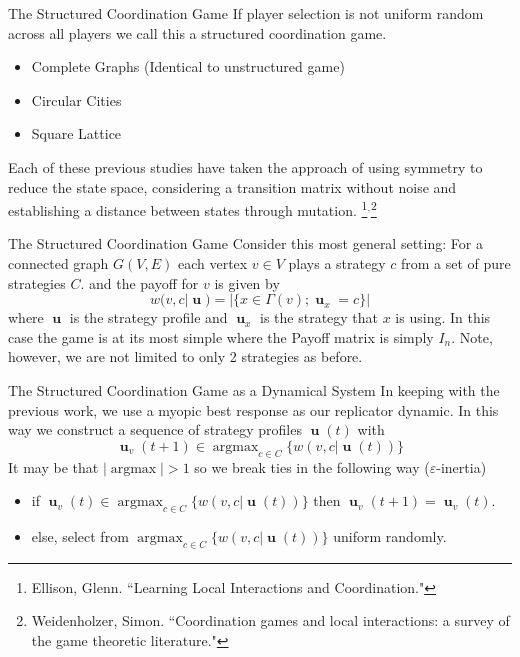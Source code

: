 \documentclass{beamer}
\DeclareMathOperator*{\argmax}{\text{argmax}}
\DeclareMathOperator{\uu}{\mathbf{u}}
\begin{document}
\begin{frame}{The Structured Coordination Game}
	If player selection is not uniform random across all players we call this a structured coordination game. 
	\begin{itemize}
		\item Complete Graphs (Identical to unstructured game)
		\item Circular Cities
		\item Square Lattice 
	\end{itemize}
	Each of these previous studies have taken the approach of using symmetry to reduce the state space, considering a transition matrix without noise and establishing a distance between states through mutation. \footnote{Ellison, Glenn. ``Learning Local Interactions and Coordination."}$^,$\footnote{Weidenholzer, Simon. ``Coordination games and local interactions: a survey of the game theoretic literature."}
\end{frame}

\begin{frame}{The Structured Coordination Game}
	Consider this most general setting: For a connected graph $G(V,E)$ each vertex $v\in V$ plays a strategy $c$ from a set of pure strategies $C$. and the payoff for $v$ is given by \begin{equation}
		w(v,c|\uu)=|\{x\in \Gamma (v);\uu_x=c\}|
	\end{equation}
	where $\uu$ is the strategy profile and $\uu_x$ is the strategy that $x$ is using. 
	In this case the game is at its most simple where the Payoff matrix is simply $I_n$. Note, however, we are not limited to only 2 strategies as before. 
\end{frame}

\begin{frame}{The Structured Coordination Game as a Dynamical System}
	In keeping with the previous work, we use a myopic best response as our replicator dynamic. In this way we construct a sequence of strategy profiles $\uu(t)$ with 
	\begin{equation}
		\uu_v(t+1)\in \argmax_{c\in C}\{w(v,c|\uu(t))\}
	\end{equation}
It may be that $|\argmax|>1$ so we break ties in the following way ($\varepsilon$-inertia) 
\begin{itemize}
	\item if $\uu_v(t)\in \argmax_{c\in C}\{w(v,c|\uu(t))\}$ then $ \uu_v(t+1)=\uu_v(t)$.
	\item else, select from $\argmax_{c\in C}\{w(v,c|\uu(t))\}$ uniform randomly. 
	\end{itemize}
\end{frame}
\end{document}
